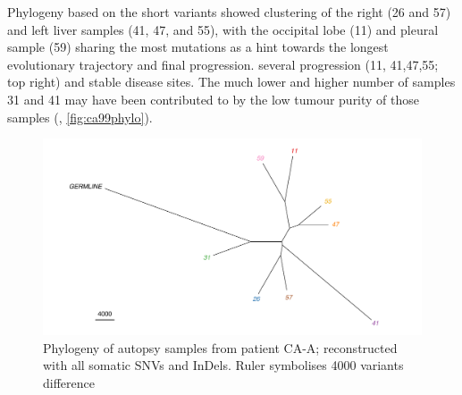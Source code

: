 Phylogeny based on the short variants showed  clustering of the right (26 and 57) and left liver samples (41, 47, and 55), with the occipital lobe (11) and pleural sample (59) sharing the most mutations as a hint towards the longest evolutionary trajectory and final progression.  several progression (11, 41,47,55; top right) and stable disease sites. The much lower and higher number of  samples 31 and 41 may have been contributed to by the low tumour purity of those samples (, \autoref{fig:ca99phylo}).

\begin{figure}[htp]
	\centering
	\includegraphics[width=.99\linewidth]{Figures/CASCADE/CA99/CA99phylo.pdf}
	\caption[Phylogeny of autopsy samples from patient CA-A]{Phylogeny of autopsy samples from patient CA-A; reconstructed with all somatic SNVs and InDels. Ruler symbolises 4000 variants difference} \label{fig:ca99phylo}
\end{figure}

